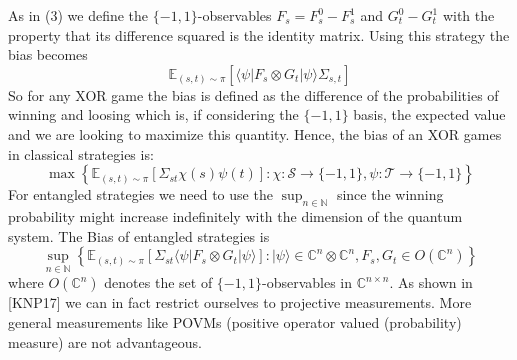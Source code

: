As in (3) we define the $\{ -1, 1 \}$-observables $F_s = F_s^0 - F_s^1$ and $G_t^0-G_t^1$ with the property that its difference squared is the identity matrix. Using this strategy the bias becomes 
\begin{equation}
\mathbb{E}_{(s,t) \sim \pi} \left[ \langle \psi \vert F_s \otimes G_t \vert \psi \rangle \Sigma_{s,t} \right]
\end{equation}
So for any XOR game the bias is defined as the difference of the probabilities of winning and loosing which is, if considering the $\{ -1, 1 \}$ basis, the expected value and we are looking to maximize this quantity. Hence, the bias of an XOR games in classical strategies is: 
\begin{equation}
\max \left\lbrace \mathbb{E}_{(s,t) \sim \pi} \left[ \Sigma_{st} \chi (s) \psi (t) \right] : \chi : \mathcal{S} \rightarrow \{ -1, 1 \}, \psi : \mathcal{T} \rightarrow \{-1, 1 \} \right\rbrace
\end{equation} 
For entangled strategies we need to use the $\sup_{n \in \mathbb{N}}$ since the winning probability might increase indefinitely with the dimension of the quantum system. 
The Bias of entangled strategies is 
\begin{equation}
\sup_{n \in \mathbb{N}} \left\lbrace \mathbb{E}_{(s,t) \sim \pi} \left[ \Sigma_{st} \langle \psi \vert F_s \otimes G_t \vert \psi \rangle \right] : \vert \psi \rangle \in \mathbb{C}^{n} \otimes \mathbb{C}^{n} , F_s, G_t \in O(\mathbb{C}^n) \right\rbrace
\end{equation}
where $O(\mathbb{C}^n)$ denotes the set of $\{ -1, 1 \}$-observables in $\mathbb{C}^{n \times n}$. As shown in [KNP17] we can in fact restrict ourselves to projective measurements. More general measurements like POVMs (positive operator valued (probability) measure) are not advantageous. 

